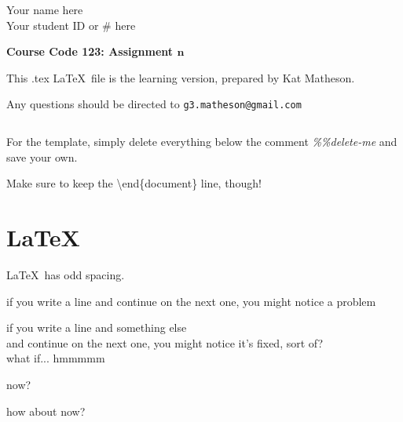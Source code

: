 \documentclass[11pt, oneside]{article}   	%
\begin{document}
 \pagestyle{empty}

\begin{flushright}
Your name here
\\
Your student ID or \# here
\end{flushright}

\vspace{12pt}

\begin{center}
\textbf{\Large{Course Code 123: Assignment $\mathbf{n}$}}
\end{center}

\vspace{24pt}


This .tex \LaTeX \ file is the learning version, prepared by Kat Matheson.

Any questions should be directed to \texttt{g3.matheson@gmail.com}

$\ $

For the template, simply delete everything below the comment \emph{\%\%delete-me} and save your own.

Make sure to keep the \textbackslash end\{document\} line, though!

\newpage

\tableofcontents

\newpage

\section{\LaTeX} \noindent

\LaTeX \ has odd spacing.

if you write a line
and continue on the next one, you might notice a problem

if you write a line and something else \\
and continue on the next one, you might notice it's fixed, sort of? \\
what if...
hmmmmm

now?








how about now?
\end{document}
